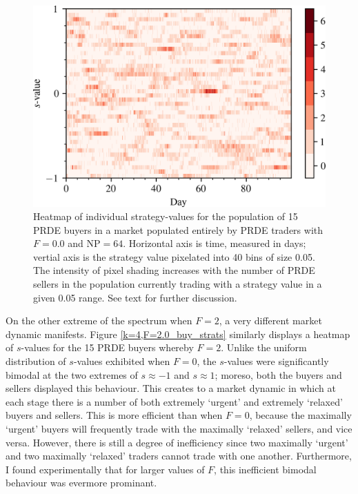 \documentclass[conference]{IEEEtran}
\begin{document}
\begin{figure}[htbp]
    \centerline{\includegraphics[width=\columnwidth]{k=4,F=0.0_buy_strats.png}}
    \caption{
        Heatmap of individual strategy-values for the population of 15 PRDE buyers in a market populated entirely by PRDE traders with $F=0.0$ and $\mathrm{NP}=64$.
        Horizontal axis is time, measured in days; vertial axis is the strategy value pixelated into 40 bins of size 0.05.
        The intensity of pixel shading increases with the number of PRDE sellers in the population currently trading with a strategy value in a given 0.05 range.
        See text for further discussion.
    }
    \label{k=4,F=0.0_buy_strats}
\end{figure}

On the other extreme of the spectrum when $F=2$, a very different market dynamic manifests.
Figure \ref{k=4,F=2.0_buy_strats} similarly displays a heatmap of $s$-values for the 15 PRDE buyers whereby $F=2$.
Unlike the uniform distribution of $s$-values exhibited when $F=0$, the $s$-values were significantly bimodal at the two extremes of $s\approx-1$ and $s\approx1$; moreso, both the buyers and sellers displayed this behaviour.
This creates to a market dynamic in which at each stage there is a number of both extremely `urgent' and extremely `relaxed' buyers and sellers.
This is more efficient than when $F=0$, because the maximally `urgent' buyers will frequently trade with the maximally `relaxed' sellers, and vice versa.
However, there is still a degree of inefficiency since two maximally `urgent' and two maximally `relaxed' traders cannot trade with one another.
Furthermore, I found experimentally that for larger values of $F$, this inefficient bimodal behaviour was evermore prominant.
\end{document}
